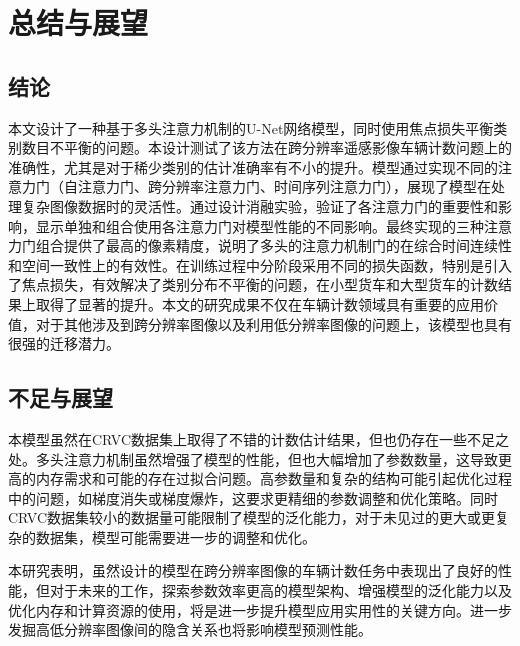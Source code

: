 
\chapter{总结与展望}
\section{结论}
本文设计了一种基于多头注意力机制的U-Net网络模型，同时使用焦点损失平衡类别数目不平衡的问题。本设计测试了该方法在跨分辨率遥感影像车辆计数问题上的准确性，尤其是对于稀少类别的估计准确率有不小的提升。模型通过实现不同的注意力门（自注意力门、跨分辨率注意力门、时间序列注意力门），展现了模型在处理复杂图像数据时的灵活性。通过设计消融实验，验证了各注意力门的重要性和影响，显示单独和组合使用各注意力门对模型性能的不同影响。最终实现的三种注意力门组合提供了最高的像素精度，说明了多头的注意力机制门的在综合时间连续性和空间一致性上的有效性。在训练过程中分阶段采用不同的损失函数，特别是引入了焦点损失，有效解决了类别分布不平衡的问题，在小型货车和大型货车的计数结果上取得了显著的提升。本文的研究成果不仅在车辆计数领域具有重要的应用价值，对于其他涉及到跨分辨率图像以及利用低分辨率图像的问题上，该模型也具有很强的迁移潜力。
\section{不足与展望}

本模型虽然在CRVC数据集上取得了不错的计数估计结果，但也仍存在一些不足之处。多头注意力机制虽然增强了模型的性能，但也大幅增加了参数数量，这导致更高的内存需求和可能的存在过拟合问题。高参数量和复杂的结构可能引起优化过程中的问题，如梯度消失或梯度爆炸，这要求更精细的参数调整和优化策略。同时CRVC数据集较小的数据量可能限制了模型的泛化能力，对于未见过的更大或更复杂的数据集，模型可能需要进一步的调整和优化。

本研究表明，虽然设计的模型在跨分辨率图像的车辆计数任务中表现出了良好的性能，但对于未来的工作，探索参数效率更高的模型架构、增强模型的泛化能力以及优化内存和计算资源的使用，将是进一步提升模型应用实用性的关键方向。进一步发掘高低分辨率图像间的隐含关系也将影响模型预测性能。

